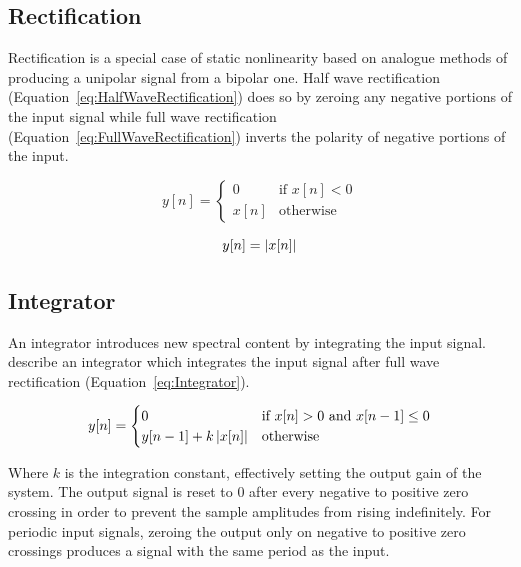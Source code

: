	\subsection{Rectification}
	\label{sec:Excitation-Methods-Rectification}
		Rectification is a special case of static nonlinearity based on analogue methods of producing a unipolar
		signal from a bipolar one. Half wave rectification (Equation~\ref{eq:HalfWaveRectification}) does so by
		zeroing any negative portions of the input signal while full wave rectification
		(Equation~\ref{eq:FullWaveRectification}) inverts the polarity of negative portions of the input.

		\begin{equation}
			y[n] = \begin{cases}
				0 & \text{if $x[n] < 0$} \\
				x[n] & \text{otherwise}
			\end{cases}
			\label{eq:HalfWaveRectification}
		\end{equation}

		\begin{equation}
			y[n] = \left|x[n]\right|
			\label{eq:FullWaveRectification}
		\end{equation}

	\subsection{Integrator}
	\label{sec:Excitation-Methods-Integrator}
		An integrator introduces new spectral content by integrating the input signal. \citet{larsen2004audio}
		describe an integrator which integrates the input signal after full wave rectification
		(Equation~\ref{eq:Integrator}).

		\begin{equation}
			y[n] = \begin{cases}
				0 & \text{if $x[n] > 0$ and $x[n - 1] \leq 0$} \\
				y[n - 1] + k\left|x[n]\right| & \text{otherwise}
			\end{cases}
			\label{eq:Integrator}
		\end{equation}

		Where $k$ is the integration constant, effectively setting the output gain of the system. The output signal
		is reset to 0 after every negative to positive zero crossing in order to prevent the sample amplitudes from
		rising indefinitely. For periodic input signals, zeroing the output only on negative to positive zero
		crossings produces a signal with the same period as the input.

